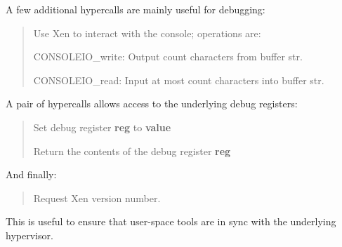\documentclass[11pt,twoside,final,openright,a4paper]{report}
\newcommand{\hypercall}[1]{\vspace{2mm}{\sf #1}}
\begin{document}
A few additional hypercalls are mainly useful for debugging: 

\begin{quote} 
\hypercall{console\_io(int cmd, int count, char *str)}

Use Xen to interact with the console; operations are:

{CONSOLEIO\_write}: Output count characters from buffer str.

{CONSOLEIO\_read}: Input at most count characters into buffer str.
\end{quote} 

A pair of hypercalls allows access to the underlying debug registers: 
\begin{quote}
\hypercall{set\_debugreg(int reg, unsigned long value)}

Set debug register {\bf reg} to {\bf value} 

\hypercall{get\_debugreg(int reg)}

Return the contents of the debug register {\bf reg}
\end{quote}

And finally: 
\begin{quote}
\hypercall{xen\_version(int cmd)}

Request Xen version number.
\end{quote} 

This is useful to ensure that user-space tools are in sync 
with the underlying hypervisor. 
\end{document}
